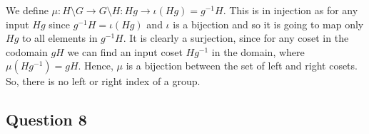 We define \( \mu : H \setminus G \to G \setminus H: Hg \to \iota \left( Hg \right) = g^{-1}H\). This
is in injection as for any input \( Hg \) since \( g^{-1}H = \iota \left( Hg \right) \) and \( \iota  \) is a bijection and so
it is going to map only \( Hg \) to all elements in \( g^{-1}H \). It is clearly a surjection, since
for any coset in the codomain \(gH\) we can find an input coset \( Hg^{-1} \) in the domain, where
\( \mu \left( Hg^{-1} \right) = gH \). Hence, \( \mu  \) is a bijection between the set of left and right cosets.
So, there is no left or right index of a group.

\subsection{Question 8}

